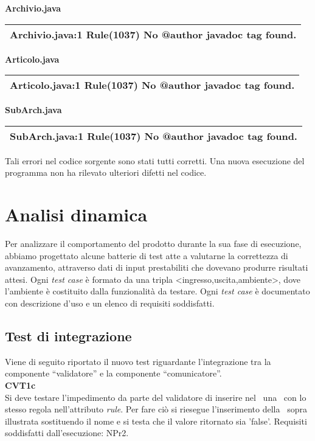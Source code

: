 \textbf{Archivio.java}
\begin{center}
\begin{tabular}{|p{12cm}|} \hline
Archivio.java:1 Rule(1037) No @author javadoc tag found.\\ \hline
\end{tabular}
\end{center}

\textbf{Articolo.java}
\begin{center}
\begin{tabular}{|p{12cm}|} \hline
Articolo.java:1 Rule(1037) No @author javadoc tag found.\\ \hline
\end{tabular}
\end{center}

\textbf{SubArch.java}
\begin{center}
\begin{tabular}{|p{12cm}|} \hline
SubArch.java:1 Rule(1037) No @author javadoc tag found.\\ \hline
\end{tabular}
\end{center}
Tali errori nel codice sorgente sono stati tutti corretti. Una nuova esecuzione del programma non ha rilevato ulteriori difetti nel codice.

\chapter{Analisi dinamica}
Per analizzare il comportamento del prodotto durante la sua fase di esecuzione, abbiamo progettato alcune batterie di test atte a valutarne la correttezza di avanzamento, attraverso dati di input prestabiliti che dovevano produrre risultati attesi.
Ogni \textit{test case} \`e formato da una tripla <ingresso,uscita,ambiente>, dove l'ambiente \`e costituito dalla funzionalit\`a da testare.
Ogni \textit{test case} \`e documentato con descrizione d'uso e un elenco di requisiti soddisfatti. 
\section{Test di integrazione}
Viene di seguito riportato il nuovo test riguardante l'integrazione tra la componente ``validatore'' e la componente ``comunicatore''. \\

\textbf{CVT1c} \\
Si deve testare l'impedimento da parte del validatore di inserire nel \rp\ una \br\ con lo stesso regola nell'attributo \textit{rule}. Per fare ci\`o si riesegue l'inserimento della \br\ sopra illustrata sostituendo il nome e si testa che il valore ritornato sia 'false'.
Requisiti soddisfatti dall'esecuzione: NPr2.\\
 \\

